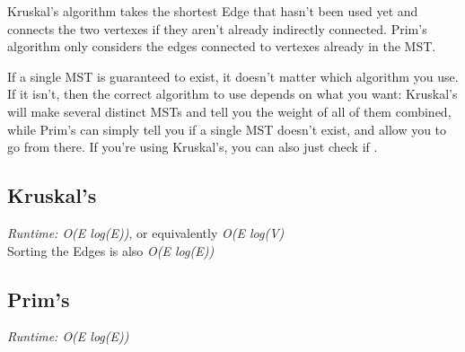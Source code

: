 
Kruskal's algorithm takes the shortest Edge that hasn't been used yet and connects the two vertexes if they aren't already indirectly connected. Prim's algorithm only considers the edges connected to vertexes already in the MST.

If a single MST is guaranteed to exist, it doesn't matter which algorithm you use. If it isn't, then the correct algorithm to use depends on what you want: Kruskal's will make several distinct MSTs and tell you the weight of all of them combined, while Prim’s can simply tell you if a single MST doesn't exist, and allow you to go from there. If you're using Kruskal's, you can also just check if .

\subsection*{Kruskal's}

\textit{Runtime: O(E log(E))}, or equivalently \textit{O(E log(V)} \\
\indent Sorting the Edges is also \textit{O(E log(E))}



\subsection*{Prim's}

\textit{Runtime: O(E log(E))}



\newpage